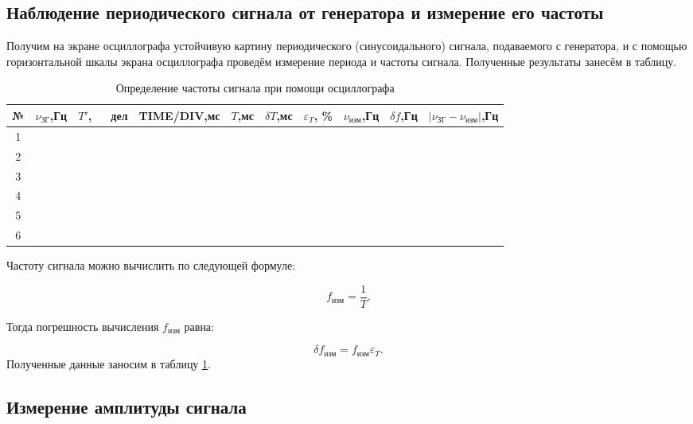 \documentclass[a4paper,12pt]{article} %
\begin{document}
	\subsection{Наблюдение периодического сигнала от генератора и измерение его частоты}
	
	Получим на экране осциллографа устойчивую картину периодического (синусоидального) сигнала, подаваемого с генератора, и с помощью горизонтальной шкалы экрана осциллографа проведём измерение периода и частоты сигнала. Полученные результаты занесём в таблицу.
	
	\begin{table}[H]
		\centering
		\caption{Определение частоты сигнала при помощи осциллографа}
		\begin{tabular}{|c|c|c|c|c|c|c|c|c|c|}
			\hline
			№ & $ \nu_\text{ЗГ} $,Гц & $ T' $,~~~дел & TIME/DIV,мс & $ T $,мс & $ \delta T $,мс & $ \varepsilon_T $, \% & $ \nu_\text{изм} $,Гц & $ \delta f $,Гц & $ \left| \nu_\text{ЗГ} - \nu_\text{изм} \right| $,Гц \\ \hline
			1 &  &  &  &  &  &  &  &  &  \\ \hline
			2 &  &  &  &  &  &  &  &  &  \\ \hline
			3 &  &  &  &  &  &  &  &  &  \\ \hline
			4 &  &  &  &  &  &  &  &  &  \\ \hline
			5 &  &  &  &  &  &  &  &  &  \\ \hline
			6 &  &  &  &  &  &  &  &  &  \\ \hline
		\end{tabular}
		\label{tab:chastota}
	\end{table}
	
	
	Частоту сигнала можно вычислить по следующей формуле:
	
	\begin{equation}
		f_\text{изм} = \frac{1}{T}.
	\end{equation}
	
	Тогда погрешность вычисления $ f_\text{изм} $ равна:
	
	\begin{equation}
		\delta f_\text{изм} = f_\text{изм}\varepsilon_T.
	\end{equation}
	Полученные данные заносим в таблицу \ref{tab:chastota}.
	
	\subsection{Измерение амплитуды сигнала}
	
\end{document}
